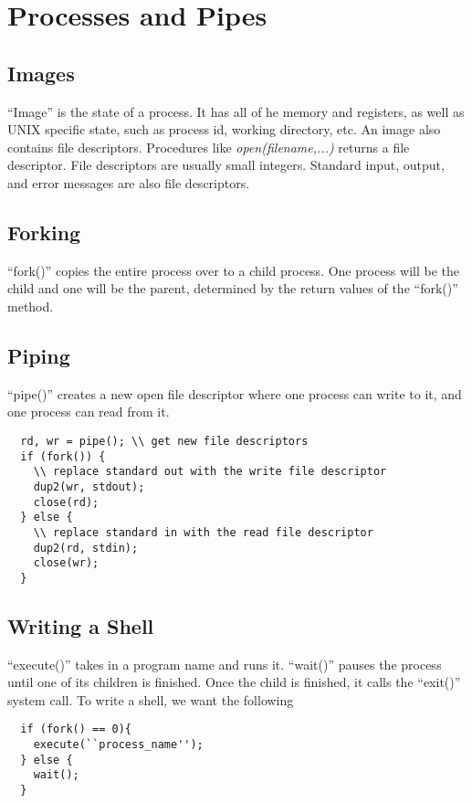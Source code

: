 \documentclass[psamsfonts]{amsart}
\begin{document}
\section{Processes and Pipes}

\subsection{Images}

``Image'' is the state of a process. It has all of he memory and registers, as well as UNIX specific state, such as process id, working directory, etc. An image also contains file descriptors. Procedures like \emph{open(filename,...)} returns a file descriptor. File descriptors are usually small integers. Standard input, output, and error messages are also file descriptors.

\subsection{Forking}

``fork()'' copies the entire process over to a child process. One process will be the child and one will be the parent, determined by the return values of the ``fork()'' method.

\subsection{Piping}

``pipe()'' creates a new open file descriptor where one process can write to it, and one process can read from it.

\begin{verbatim}
  rd, wr = pipe(); \\ get new file descriptors
  if (fork()) {
    \\ replace standard out with the write file descriptor
    dup2(wr, stdout);
    close(rd);
  } else {
    \\ replace standard in with the read file descriptor
    dup2(rd, stdin);
    close(wr);
  }
\end{verbatim}

\subsection{Writing a Shell}

``execute()'' takes in a program name and runs it. ``wait()'' pauses the process until one of its children is finished. Once the child is finished, it calls the ``exit()'' system call. To write a shell, we want the following

\begin{verbatim}
  if (fork() == 0){
    execute(``process_name'');
  } else {
    wait();
  }
\end{verbatim}
\end{document}
